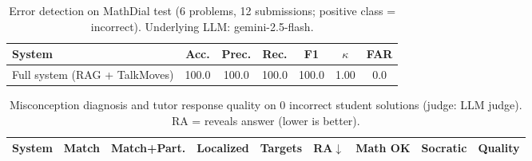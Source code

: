 \begin{table}[t]\centering\small
\caption{Error detection on MathDial test (6 problems, 12 submissions; positive class = incorrect). Underlying LLM: gemini-2.5-flash.}
\begin{tabular}{lcccccc}\toprule
System & Acc. & Prec. & Rec. & F1 & $\kappa$ & FAR \\\midrule
Full system (RAG + TalkMoves) & 100.0 & 100.0 & 100.0 & 100.0 & 1.00 & 0.0 \\
\bottomrule\end{tabular}\end{table}

\begin{table}[t]\centering\small
\caption{Misconception diagnosis and tutor response quality on 0 incorrect student solutions (judge: LLM judge). RA = reveals answer (lower is better).}
\begin{tabular}{lcccccccc}\toprule
System & Match & Match+Part. & Localized & Targets & RA$\downarrow$ & Math OK & Socratic & Quality \\\midrule
\bottomrule\end{tabular}\end{table}
